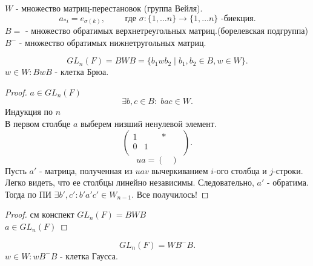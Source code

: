 \documentclass[12pt]{report}
\begin{document}
\begin{defn}
    $W$ - множество матриц-перестановок (группа Вейля).
    \[
	a_{*i} = e_{\sigma(k)}, \qquad \mbox{ где } \sigma : \{1, \ldots n \} \to \{1, \ldots n\} \mbox{ -биекция}
    .\] 
    $B = $
    - множество обратимых верхнетреугольных матриц.(борелевская подгруппа)
    $B^{-}$ - множество обратимых нижнетругольных матриц.
\end{defn}
\begin{thm}
\[
    GL_n(F) = BWB = \{b_1 w b_2 \mid b_1, b_2 \in B, w \in W\}
.\] 
$ w  \in W: B w B$ - клетка Брюа.
\end{thm}
\begin{proof}
    $a \in GL_n (F)$ 
    \[
    \exists b, c \in B: \; bac \in W
    .\] 
    Индукция по $n$\\
    В первом столбце $a$ выберем низший ненулевой элемент.%
    \[
    \left ( 
    \begin{array}{cccccc}
    1 &&& * && \\
    0 &1&&  && \\
    \end{array}
    \right )
    .\] 
    $$
    ua = \left ( 
    \begin{array}{ccc}
    
    \end{array}
    \right )
    $$
    Пусть $a'$ - матрица, полученная из $ uav$ вычеркиванием $i$-ого столбца и $j$-строки. Легко видеть, что ее столбцы линейно независимы. Следовательно, $a'$ - обратима. Тогда по ПИ $\exists b', c' : b' a' c' \in W_{n-1}$. Все получилось!

\end{proof}
\begin{proof}
    см конспект
    $GL_n (F) = BWB$ \\
    $a \in  GL_n(F)$
\end{proof}
\begin{thm}
    \[
	GL_n(F) = W B^{-} B
    .\] 
    $w \in W: w B^{-} B $ - клетка Гаусса.
\end{thm}
\end{document}
